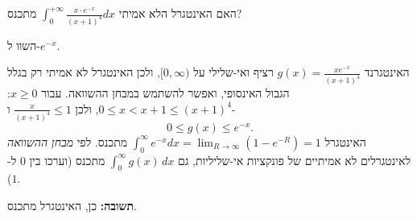
\begin{question}
האם האינטגרל הלא אמיתי $\displaystyle\int_0^{+\infty}\frac{x\cdot e^{-x}}{(x+1)^4}dx$ מתכנס?
\end{question}

\begin{hint}
השוו ל-$e^{-x}$.
\end{hint}

\begin{solution}
האינטגרנד $g(x)=\frac{xe^{-x}}{(x+1)^4}$ רציף ואי-שלילי על $[0,\infty)$, ולכן האינטגרל לא אמיתי רק בגלל הגבול האינסופי, ואפשר להשתמש במבחן ההשוואה.
עבור $x\ge0$: $0\le x<x+1\le(x+1)^4$, ולכן $\frac{x}{(x+1)^4}\le1$ ו-
\[
0\le g(x)\le e^{-x}.
\]
האינטגרל $\int_0^\infty e^{-x}dx=\lim_{R\to\infty}\left(1-e^{-R}\right)=1$ מתכנס. לפי \emph{מבחן ההשוואה} לאינטגרלים לא אמיתיים של פונקציות אי-שליליות, גם $\int_0^\infty g(x)\,dx$ מתכנס (וערכו בין $0$ ל-$1$).

\textbf{תשובה:} כן, האינטגרל מתכנס.
\end{solution}

